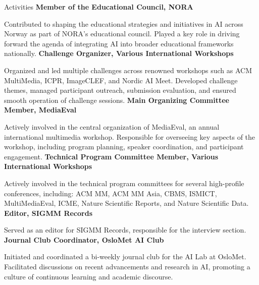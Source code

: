\begin{rubric}{Activities}
\entry*[2023 -- present]%
\textbf{Member of the Educational Council, NORA} \par 
Contributed to shaping the educational strategies and initiatives in AI across Norway as part of NORA's educational council. Played a key role in driving forward the agenda of integrating AI into broader educational frameworks nationally.
% 
\entry*[2018 -- present]%
\textbf{Challenge Organizer, Various International Workshops} \par
Organized and led multiple challenges across renowned workshops such as ACM MultiMedia, ICPR, ImageCLEF, and Nordic AI Meet. Developed challenge themes, managed participant outreach, submission evaluation, and ensured smooth operation of challenge sessions.
%
\entry*[2018 -- present]%
\textbf{Main Organizing Committee Member, MediaEval} \par
Actively involved in the central organization of MediaEval, an annual international multimedia workshop. Responsible for overseeing key aspects of the workshop, including program planning, speaker coordination, and participant engagement.
% 
\entry*[2018 -- present]%
\textbf{Technical Program Committee Member, Various International Workshops} \par
Actively involved in the technical program committees for several high-profile conferences, including: ACM MM, ACM MM Asia, CBMS, ISMICT, MultiMediaEval, ICME, Nature Scientific Reports, and Nature Scientific Data.
%
\entry*[2019 -- 2023]%
\textbf{Editor, SIGMM Records} \par
Served as an editor for SIGMM Records, responsible for the interview section.
%
\entry*[2019 -- 2020]%
\textbf{Journal Club Coordinator, OsloMet AI Club} \par
Initiated and coordinated a bi-weekly journal club for the AI Lab at OsloMet. Facilitated discussions on recent advancements and research in AI, promoting a culture of continuous learning and academic discourse.
\end{rubric}
